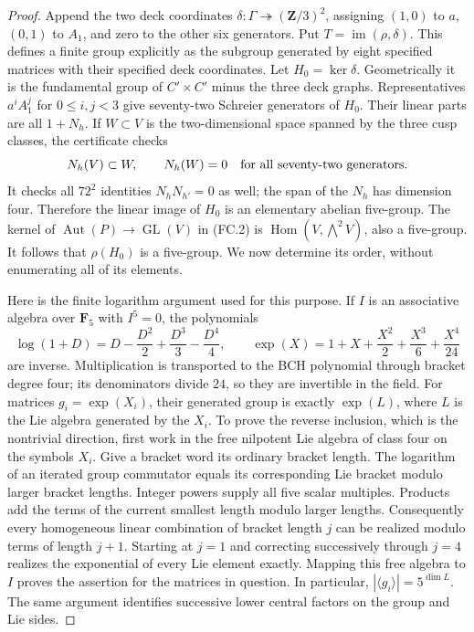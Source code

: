 \begin{proof}
Append the two deck coordinates
$\delta:\Gamma\twoheadrightarrow(\mathbf Z/3)^2$, assigning
$(1,0)$ to $a$, $(0,1)$ to $A_1$, and zero to the other six
generators. Put $T=\operatorname{im}(\rho,\delta)$.
This defines a finite group explicitly as the subgroup generated
by eight specified matrices with their specified deck coordinates.
Let $H_0=\ker\delta$. Geometrically it is the fundamental group of
$C'\times C'$ minus the three deck graphs. Representatives
$a^iA_1^j$ for $0\le i,j<3$ give seventy-two Schreier generators
of $H_0$. Their linear parts are all $1+N_h$. If $W\subset V$
is the two-dimensional space spanned by the three cusp classes,
the certificate checks
\[
 N_h(V)\subset W,\qquad N_h(W)=0
 \quad\hbox{for all seventy-two generators}.
\]
It checks all $72^2$ identities $N_hN_{h'}=0$ as well; the span of
the $N_h$ has dimension four. Therefore the linear image of $H_0$
is an elementary abelian five-group. The kernel of
$\operatorname{Aut}(P)\to\operatorname{GL}(V)$ in (FC.2) is
$\operatorname{Hom}(V,\bigwedge^2V)$, also a five-group.
It follows that $\rho(H_0)$ is a five-group. We now determine its
order, without enumerating all of its elements.

Here is the finite logarithm argument used for this purpose. If $I$
is an associative algebra over $\mathbf F _5$ with $I^5=0$, the
polynomials
\[
 \log(1+D)=D-\frac{D^2}{2}+\frac{D^3}{3}-\frac{D^4}{4},
 \qquad
 \exp(X)=1+X+\frac{X^2}{2}+\frac{X^3}{6}+\frac{X^4}{24}
\]
are inverse. Multiplication is transported to the BCH polynomial
through bracket degree four; its denominators divide $24$, so they
are invertible in the field. For matrices $g_i=\exp(X_i)$, their
generated group is exactly $\exp(L)$, where $L$ is the Lie algebra
generated by the $X_i$. To prove the reverse inclusion, which is the
nontrivial direction, first work in the free nilpotent Lie algebra
of class four on the symbols $X_i$. Give a bracket word its ordinary
bracket length. The logarithm of an iterated group commutator equals
its corresponding Lie bracket modulo larger bracket lengths.
Integer powers supply all five scalar multiples. Products add the
terms of the current smallest length modulo larger lengths.
Consequently every homogeneous linear combination of bracket length
$j$ can be realized modulo terms of length $j+1$. Starting at $j=1$
and correcting successively through $j=4$ realizes the exponential
of every Lie element exactly. Mapping this free algebra to $I$
proves the assertion for the matrices in question. In particular,
$|\langle g_i\rangle|=5^{\dim L}$. The same argument identifies
successive lower central factors on the group and Lie sides.


\end{proof}
